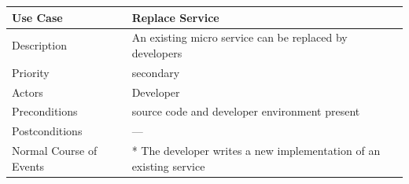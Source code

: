 \begin{longtable}[]{@{}ll@{}}
\toprule
\begin{minipage}[b]{0.27\columnwidth}\raggedright\strut
\textbf{Use Case}\strut
\end{minipage} & \begin{minipage}[b]{0.68\columnwidth}\raggedright\strut
\textbf{Replace Service}\strut
\end{minipage}\tabularnewline
\midrule
\endhead
\begin{minipage}[t]{0.27\columnwidth}\raggedright\strut
Description\strut
\end{minipage} & \begin{minipage}[t]{0.68\columnwidth}\raggedright\strut
An existing micro service can be replaced by developers\strut
\end{minipage}\tabularnewline
\begin{minipage}[t]{0.27\columnwidth}\raggedright\strut
Priority\strut
\end{minipage} & \begin{minipage}[t]{0.68\columnwidth}\raggedright\strut
secondary\strut
\end{minipage}\tabularnewline
\begin{minipage}[t]{0.27\columnwidth}\raggedright\strut
Actors\strut
\end{minipage} & \begin{minipage}[t]{0.68\columnwidth}\raggedright\strut
Developer\strut
\end{minipage}\tabularnewline
\begin{minipage}[t]{0.27\columnwidth}\raggedright\strut
Preconditions\strut
\end{minipage} & \begin{minipage}[t]{0.68\columnwidth}\raggedright\strut
source code and developer environment present\strut
\end{minipage}\tabularnewline
\begin{minipage}[t]{0.27\columnwidth}\raggedright\strut
Postconditions\strut
\end{minipage} & \begin{minipage}[t]{0.68\columnwidth}\raggedright\strut
---\strut
\end{minipage}\tabularnewline
\begin{minipage}[t]{0.27\columnwidth}\raggedright\strut
Normal Course of Events\strut
\end{minipage} & \begin{minipage}[t]{0.68\columnwidth}\raggedright\strut
* The developer writes a new implementation of an existing service

\end{minipage}
\end{longtable}
